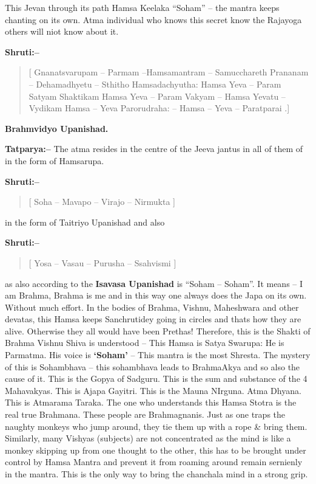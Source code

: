 This Jevan through its path Hamsa Keelaka “Soham” – the mantra keeps chanting on its own. Atma individual who knows this secret know the Rajayoga others will niot know about it.

\textbf{Shruti:–}

\begin{verse}
[ Gnanatsvarupam – Parmam –Hamsamantram – Samucchareth  Prananam – Dehamadhyetu – Sthitho Hamsadachyutha:  Hamsa Yeva – Param Satyam Shaktikam  Hamsa Yeva – Param Vakyam – Hamsa Yevatu – Vydikam  Hamsa – Yeva Parorudraha: – Hamsa – Yeva – Paratparai .]
\end{verse}

\begin{flushright}
\textbf{Brahmvidyo Upanishad.}
\end{flushright}

\textbf{Tatparya:–} The atma resides in the centre of the Jeeva jantus in all of them of in the form of Hamsarupa.

\textbf{Shruti:–}

\begin{verse}
[ Soha – Mavapo – Virajo – Nirmukta ]
\end{verse}

in the form of Taitriyo Upanishad and also

\textbf{Shruti:–}

\begin{verse}
[ Yosa – Vasau – Purusha – Ssahvismi ]
\end{verse}

as also according to the \textbf{Isavasa Upanishad} is “Soham – Soham”. It means – I am Brahma, Brahma is me and in this way one always does the Japa on its own. Without much effort. In the bodies of Brahma, Vishnu, Maheshwara and other devatas, this Hamsa keeps Sanchrutidey going in circles and thats how they are alive. Otherwise they all would have been Prethas! Therefore, this is the Shakti of Brahma Vishnu Shiva is understood – This Hamsa is Satya Swarupa: He is Parmatma. His voice is \textbf{‘Soham’} – This mantra is the most Shresta. The mystery of this is Sohambhava – this sohambhava leads to BrahmaAkya and so also the cause of it. This is the Gopya of Sadguru. This is the sum and substance of the 4 Mahavakyas. This is Ajapa Gayitri. This is the Mauna NIrguna. Atma Dhyana. This is Atmarama Taraka. The one who understands this Hamsa Stotra is the real true Brahmana. These people are Brahmagnanis. Just as one traps the naughty monkeys who jump around, they tie them up with a rope \& bring them. Similarly, many Vishyas (subjects) are not concentrated as the mind is like a monkey skipping up from one thought to the other, this has to be brought under control by Hamsa Mantra and prevent it from roaming around remain sernienly in the mantra. This is the only way to bring the chanchala mind in a strong grip.

